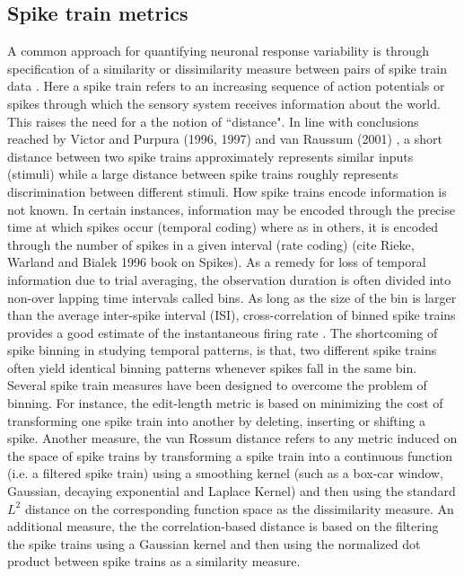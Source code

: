\subsection{Spike train metrics}
A common approach for quantifying neuronal response variability is through specification of a 
similarity or dissimilarity measure between pairs of spike train data
\cite{Brown2004, Victor1996, Victor1998, Rossum2001,houghton2010measuring, Schreiber2003}.
Here a spike train refers to an increasing sequence of action potentials or spikes
through which the sensory system receives information about the world.
This raises the need for a the notion of ``distance". 
In line with conclusions reached by Victor and Purpura (1996, 1997) and
van Raussum (2001) \cite{Victor1996, Victor1998, Rossum2001}, a short distance between two spike trains approximately represents similar inputs (stimuli) while a large distance between spike trains roughly represents discrimination between different stimuli.
How spike trains encode information is not known. In certain instances, information may be encoded through the precise time at which spikes occur (temporal coding) where as in others, it is encoded through the number of spikes in a given interval (rate coding) (cite Rieke, Warland and Bialek 1996 book on Spikes).
As a remedy for loss of temporal information due to trial averaging, the observation duration is often divided into non-over lapping time intervals called bins.
As long as the size of the bin is larger than the average inter-spike interval (ISI), cross-correlation of binned spike trains provides a good estimate of the instantaneous firing rate
\cite{Brown2004}. The shortcoming of spike binning in studying temporal patterns, is that, two different spike trains often yield identical binning patterns whenever spikes fall in the same bin. Several spike train measures have been designed to overcome the problem of binning. For instance, the edit-length metric \cite{Victor1996, Victor1998} is based on minimizing the cost of transforming one spike train into another by deleting, inserting or shifting a spike. Another measure, the van Rossum distance \cite{Rossum2001, houghton2010measuring} refers to any metric induced on the space of spike trains by transforming a spike train into a continuous function (i.e. a filtered spike train) using a smoothing kernel (such as a box-car window, Gaussian, decaying exponential and  Laplace Kernel) and then using the standard $L^2$ distance on the corresponding function space as the dissimilarity measure. An additional measure, the the correlation-based distance \cite{Schreiber2003} is based on the filtering the spike trains using a Gaussian kernel and then using the normalized dot product between  spike trains as a  similarity measure.
